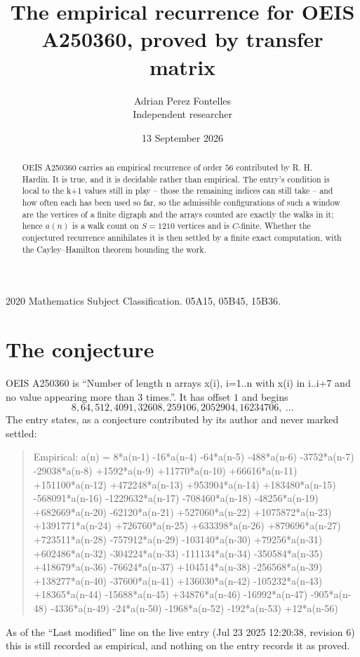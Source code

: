 \documentclass[11pt,a4paper]{article}
\title{The empirical recurrence for OEIS A250360, proved by transfer matrix}
\author{Adrian Perez Fontelles\\ \small Independent researcher}
\date{13 September 2026}
\theoremstyle{plain}
\theoremstyle{definition}
\begin{document}
\maketitle

\begin{abstract}
OEIS A250360 carries an empirical recurrence of order $56$ contributed by R. H. Hardin. It is
true, and it is decidable rather than empirical. The entry's condition is local to the k+1 values still in play -- those the remaining indices can still take -- and how often each has been used so far, so
the admissible configurations of such a window are the vertices of a finite digraph and the
arrays counted are exactly the walks in it; hence $a(n)$ is a walk count on $S=1210$ vertices
and is $C$-finite. Whether the conjectured recurrence annihilates it is then settled by a
finite exact computation, with the Cayley--Hamilton theorem bounding the work.
\end{abstract}

\noindent\small 2020 Mathematics Subject Classification. 05A15, 05B45, 15B36.\normalsize

\section{The conjecture}

OEIS A250360 is ``Number of length n arrays x(i), i=1..n with x(i) in i..i+7 and no value appearing more than 3 times.''. It has offset $1$ and begins
\[
8, 64, 512, 4091, 32608, 259106, 2052904, 16234706,\ \dots
\]
The entry states, as a conjecture contributed by its author and never marked settled:
\begin{quote}
Empirical: a(n) = 8*a(n-1) -16*a(n-4) -64*a(n-5) -488*a(n-6) -3752*a(n-7) -29038*a(n-8) +1592*a(n-9) +11770*a(n-10) +66616*a(n-11) +151100*a(n-12) +472248*a(n-13) +953904*a(n-14) +183480*a(n-15) -568091*a(n-16) -1229632*a(n-17) -708460*a(n-18) -48256*a(n-19) +682669*a(n-20) -62120*a(n-21) +527060*a(n-22) +1075872*a(n-23) +1391771*a(n-24) +726760*a(n-25) +633398*a(n-26) +879696*a(n-27) +723511*a(n-28) -757912*a(n-29) -103140*a(n-30) +79256*a(n-31) +602486*a(n-32) -304224*a(n-33) -111134*a(n-34) -350584*a(n-35) +418679*a(n-36) -76624*a(n-37) +104514*a(n-38) -256568*a(n-39) +138277*a(n-40) -37600*a(n-41) +136030*a(n-42) -105232*a(n-43) +18365*a(n-44) -15688*a(n-45) +34876*a(n-46) -16992*a(n-47) -905*a(n-48) -4336*a(n-49) -24*a(n-50) -1968*a(n-52) -192*a(n-53) +12*a(n-56)
\end{quote}
As of the ``Last modified'' line on the live entry (Jul 23 2025 12:20:38, revision 6) this is still
recorded as empirical, and nothing on the entry records it as proved.
\end{document}
